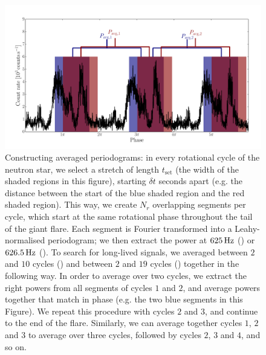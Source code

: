 \documentclass{emulateapj}
\begin{document}
\begin{figure}[htbp]
\begin{center}
\includegraphics[width=18cm]{f1.pdf}
\caption{Constructing averaged periodograms: in every rotational cycle of the neutron star, we select a stretch of length $t_{\mathrm{set}}$ (the width of the shaded regions in this figure), starting $\delta t$ seconds apart (e.g. the distance between the start of the blue shaded region and the red shaded region). This way, we create $N_r$ overlapping segments per cycle, which start at the same
 rotational phase throughout the tail of the giant flare. Each segment is Fourier transformed into a Leahy-normalised periodogram; we then extract the power at $625 \,\mathrm{Hz}$ (\rxte) or $626.5\,\mathrm{Hz}$ (\rhessi). To search for long-lived signals, we averaged between $2$ and $10$ cycles (\rxte) and between $2$ and $19$ cycles (\rhessi) together in the following way. In order to average over two cycles, we extract the right powers from all segments of cycles $1$ and $2$, and average powers together that match in phase (e.g. the two blue segments in this Figure). We repeat this procedure with cycles $2$ and $3$, and continue to the end of the flare. Similarly, we can average together cycles $1$, $2$ and $3$ to average over three cycles, followed by cycles $2$, $3$ and $4$, and so on. }
\label{fig:analysis1}
\end{center}
\end{figure}
\end{document}
